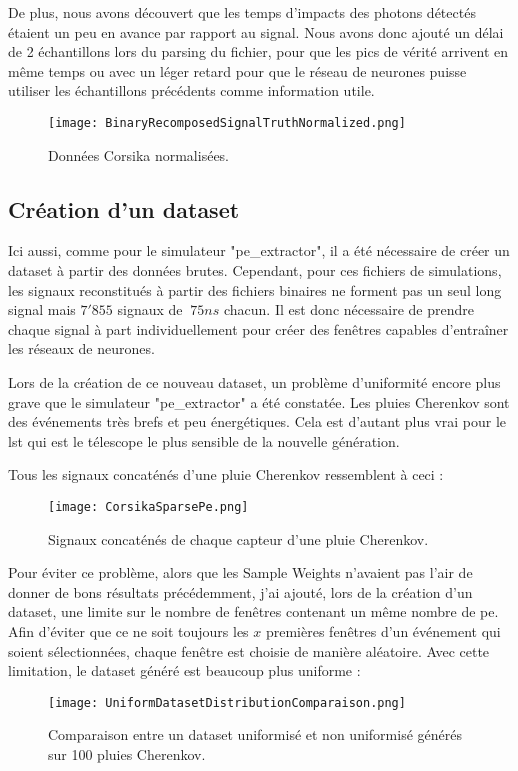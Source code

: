 De plus, nous avons découvert que les temps d'impacts des photons détectés étaient un peu en avance par rapport
au signal. Nous avons donc ajouté un délai de 2 échantillons lors du parsing du fichier, pour que les pics de vérité arrivent en 
même temps ou avec un léger retard pour que le réseau de neurones puisse utiliser les échantillons précédents comme information utile.

\begin{figure}[tbph!]
	\centering
	\texttt{[image: BinaryRecomposedSignalTruthNormalized.png]}
	\caption[Données Corsika normalisées]{Données Corsika normalisées.}
\end{figure}

\subsection{Création d'un dataset}
Ici aussi, comme pour le simulateur "pe\_extractor", il a été nécessaire de créer un dataset à partir des données brutes.
Cependant, pour ces fichiers de simulations, les signaux reconstitués à partir des fichiers binaires ne forment pas un seul long
signal mais $7'855$ signaux de $~75ns$ chacun. Il est donc nécessaire de prendre chaque signal à part individuellement 
pour créer des fenêtres capables d'entraîner les réseaux de neurones.

Lors de la création de ce nouveau dataset, un problème d'uniformité encore plus grave que le simulateur "pe\_extractor" a été constatée.
Les pluies Cherenkov sont des événements très brefs et peu énergétiques. Cela est d'autant plus vrai pour le \gls{lst} 
qui est le télescope le plus sensible de la nouvelle génération.

Tous les signaux concaténés d'une pluie Cherenkov ressemblent à ceci :
\begin{figure}[tbph!]
	\centering
	\texttt{[image: CorsikaSparsePe.png]}
	\caption[Signaux concaténés de chaque capteur d'une pluie Cherenkov]{Signaux concaténés de chaque capteur d'une pluie Cherenkov.}
\end{figure}

Pour éviter ce problème, alors que les Sample Weights n'avaient pas l'air de donner de bons résultats précédemment,
j'ai ajouté, lors de la création d'un dataset, une limite sur le nombre de fenêtres contenant un même nombre de \gls{pe}. 
Afin d'éviter que ce ne soit toujours les $x$ premières fenêtres d'un événement qui soient sélectionnées, chaque fenêtre est choisie de manière aléatoire.
Avec cette limitation, le dataset généré est beaucoup plus uniforme :
\newpage
\begin{figure}[tbph!]
	\centering
	\texttt{[image: UniformDatasetDistributionComparaison.png]}
	\caption[Comparaison entre un dataset uniformisé et non uniformisé générés sur 100 pluies Cherenkov]{Comparaison entre un dataset uniformisé et non uniformisé générés sur 100 pluies Cherenkov.}
\end{figure}

